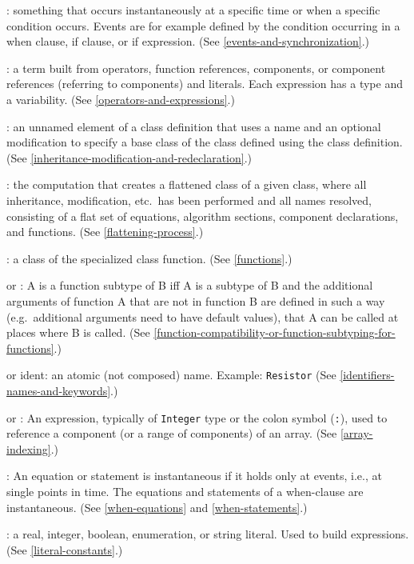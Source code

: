 : something that occurs instantaneously at a specific time
or when a specific condition occurs. Events are for example defined by
the condition occurring in a when clause, if clause, or if expression.
(See \cref{events-and-synchronization}.)

: a term built from operators, function references,
components, or component references (referring to components) and
literals. Each expression has a type and a variability. (See \cref{operators-and-expressions}.)

: an unnamed element of a class definition that
uses a name and an optional modification to specify a base class of the
class defined using the class definition. (See \cref{inheritance-modification-and-redeclaration}.)

: the computation that creates a flattened class of a
given class, where all inheritance, modification, etc.\ has been
performed and all names resolved, consisting of a flat set of equations,
algorithm sections, component declarations, and functions. (See \cref{flattening-process}.)

: a class of the specialized class function. (See \cref{functions}.)

 or : A
is a function subtype of B iff A is a subtype of B and the additional
arguments of function A that are not in function B are defined in such a
way (e.g.\ additional arguments need to have default values), that A can
be called at places where B is called. (See \cref{function-compatibility-or-function-subtyping-for-functions}.)

 or ident: an atomic (not composed) name. Example:
\lstinline!Resistor! (See \cref{identifiers-names-and-keywords}.)

 or : An expression, typically of \lstinline!Integer! type or the colon symbol (\lstinline!:!), used to reference a component (or a range of components) of an array.  (See \cref{array-indexing}.)

: An equation or statement is instantaneous if it
holds only at events, i.e., at single points in time. The equations and
statements of a when-clause are instantaneous. (See \cref{when-equations} and
\cref{when-statements}.)

: a real, integer, boolean, enumeration, or string
literal. Used to build expressions. (See \cref{literal-constants}.)

